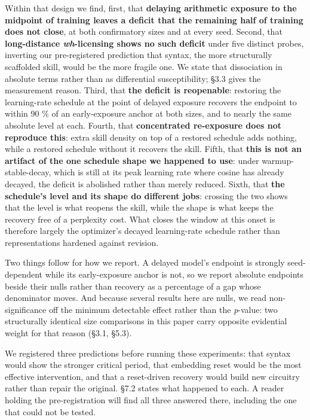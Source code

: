 \documentclass[11pt]{article}
\begin{document}
Within that design we find, first, that \textbf{delaying arithmetic exposure to the midpoint of
training leaves a deficit that the remaining half of training does not close}, at both
confirmatory sizes and at every seed. Second, that \textbf{long-distance \emph{wh}-licensing shows no
such deficit} under five distinct probes, inverting our pre-registered prediction that
syntax, the more structurally scaffolded skill, would be the more fragile one. We state that
dissociation in absolute terms rather than as differential susceptibility; §3.3 gives the
measurement reason. Third, that \textbf{the deficit is reopenable}: restoring the learning-rate
schedule at the point of delayed exposure recovers the endpoint to within 90 \% of an
early-exposure anchor at both sizes, and to nearly the same absolute level at each. Fourth,
that \textbf{concentrated re-exposure does not reproduce this}: extra skill density on top of a
restored schedule adds nothing, while a restored schedule without it recovers the skill.
Fifth, that \textbf{this is not an artifact of the one schedule shape we happened to use}: under
warmup-stable-decay, which is still at its peak learning rate where cosine has already
decayed, the deficit is abolished rather than merely reduced. Sixth, that \textbf{the schedule's
level and its shape do different jobs}: crossing the two shows that the level is what
reopens the skill, while the shape is what keeps the recovery free of a perplexity cost.
What closes the window at this onset is therefore largely the optimizer's decayed
learning-rate schedule rather than representations hardened against revision.

Two things follow for how we report. A delayed model's endpoint is strongly seed-dependent
while its early-exposure anchor is not, so we report absolute endpoints beside their nulls
rather than recovery as a percentage of a gap whose denominator moves. And because several
results here are nulls, we read non-significance off the minimum detectable effect rather
than the \emph{p}-value: two structurally identical size comparisons in this paper carry
opposite evidential weight for that reason (§3.1, §5.3).

We registered three predictions before running these experiments: that syntax would show the
stronger critical period, that embedding reset would be the most effective intervention, and
that a reset-driven recovery would build new circuitry rather than repair the original. §7.2
states what happened to each. A reader holding the pre-registration will find all three
answered there, including the one that could not be tested.
\end{document}
